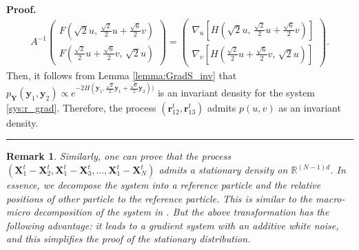 \documentclass[]{elsarticle}
\def\R{\mathbb{R}}
\newcommand{\mbf}[1]{\boldsymbol{#1}}
\newcommand{\br}{\mbf{r}}
\newcommand{\bX}{\mbf{X}}
\newcommand{\bY}{\mbf{Y}}
\newcommand{\by}{\mbf{y}}
\newtheorem{remark}[theorem]{Remark}
\newenvironment{proof}[1][Proof]{\noindent\textbf{#1.} }{\ \rule{0.5em}{0.5em}}
\numberwithin{equation}{section}
\numberwithin{theorem}{section}
\begin{document}
\begin{proof}
\begin{align*}
 A^{-1} \begin{pmatrix} F(\sqrt{2}u,\, \frac{\sqrt{2}}{2}u + \frac{\sqrt{6}}{2}v) \\ F(\frac{\sqrt{2}}{2}u + \frac{\sqrt{6}}{2}v,\, \sqrt{2}u) \end{pmatrix}  =  \begin{pmatrix} \nabla_u[  H(\sqrt{2}u,\, \frac{\sqrt{2}}{2}u + \frac{\sqrt{6}}{2}v) ] \\ \nabla_v[ H(\frac{\sqrt{2}}{2}u + \frac{\sqrt{6}}{2}v,\, \sqrt{2}u) ] \end{pmatrix}. 
\end{align*}
Then, it follows from Lemma \ref{lemma:GradS_inv} that $p_{\bY}(\by_1,\by_2)\propto e^{-2 H(\by_1,\frac{\sqrt{2}}{2}\by_1 + \frac{\sqrt{6}}{2}\by_2))}$ is an invariant density for the system \eqref{sys:r_grad}. Therefore, the process $(\br^t_{12},\br^t_{13})$ admits $p(u,v)$
as an invariant density. 
\end{proof}



\begin{remark}
Similarly, one can prove that the process $(\bX^{t}_1- \bX^t_2, \bX^{t}_1- \bX^t_3,\dots,\bX^{t}_1- \bX^t_N)$ admits a stationary density on $\R^{(N-1)d}$. In essence, we decompose the system into a reference particle and the relative positions of other particle to the reference particle. This is similar to the macro-micro decomposition of the system in \cite{malrieu2003convergence,cattiaux2008probabilistic, ha2009emergence,cattiaux2018stochastic}. But the above transformation has the following advantage: it leads to a gradient system with an additive white noise, and this simplifies the proof of the stationary distribution.  %
\end{remark}
\end{document}
